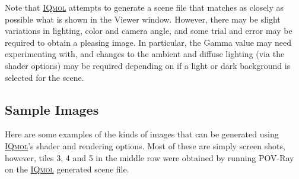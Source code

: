 \documentclass[a4paper,12pt]{article}
\newcommand{\iqmol}{\href{http://iqmol.org}{{\scshape IQmol}}}
\begin{document}
Note that \iqmol{} attempts to generate a scene file that matches as closely as
possible what is shown in the Viewer window.  However, there may be slight
variations in lighting, color and camera angle, and some trial and error may be
required to obtain a pleasing image.  In particular, the Gamma value may need
experimenting with, and changes to the ambient and diffuse lighting (via the
shader options) may be required depending on if a light or dark background is
selected for the scene.


\newpage
\subsection{Sample Images}

Here are some examples of the kinds of images that can be generated using
\iqmol{}'s shader and rendering options.  Most of these are simply screen
shots, however, tiles 3, 4 and 5 in the middle row were obtained by 
running POV-Ray on the \iqmol{} generated scene file.
\end{document}
